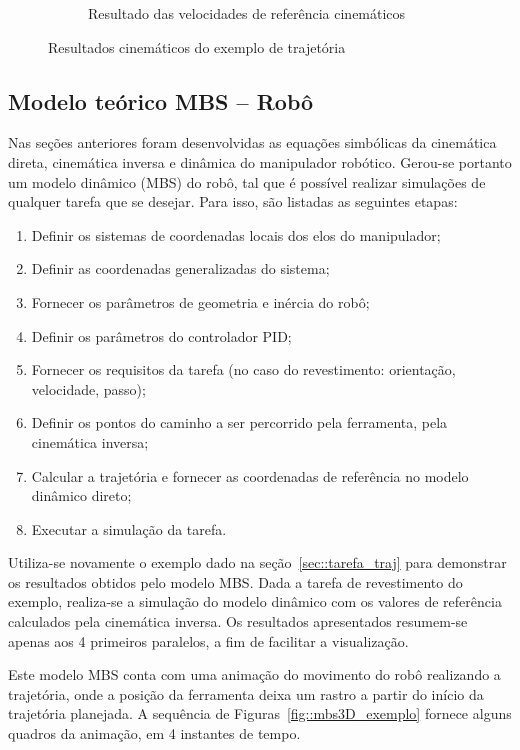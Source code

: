 \begin{figure}[h]
\begin{subfigure}[b]{0.45\textwidth}
        \caption{Resultado das velocidades de referência cinemáticos}
        \label{fig::uxt_exemplo}
    \end{subfigure}
    \caption{Resultados cinemáticos do exemplo de
    trajetória}\label{fig::res_exemplo}
\end{figure}


\subsection{Modelo teórico MBS -- Robô}

Nas seções anteriores foram desenvolvidas as equações simbólicas da
cinemática direta, cinemática inversa e dinâmica do manipulador robótico. 
Gerou-se portanto um modelo dinâmico (MBS) do robô, tal que é
possível realizar simulações de qualquer tarefa que se desejar. Para isso, são
listadas as seguintes etapas:

\begin{enumerate}
  \item Definir os sistemas de coordenadas locais dos elos do manipulador;
  \item Definir as coordenadas generalizadas do sistema;
  \item Fornecer os parâmetros de geometria e inércia do robô;
  \item Definir os parâmetros do controlador PID;
  \item Fornecer os requisitos da tarefa (no caso do revestimento: orientação,
  velocidade, passo);
  \item Definir os pontos do caminho a ser percorrido pela ferramenta, pela
  cinemática inversa;
  \item Calcular a trajetória e fornecer as coordenadas de referência no
  modelo dinâmico direto;
  \item Executar a simulação da tarefa. 
\end{enumerate}

Utiliza-se novamente o exemplo dado na seção~\ref{sec::tarefa_traj} para
demonstrar os resultados obtidos pelo modelo MBS. Dada a tarefa de revestimento
do exemplo, realiza-se a simulação do modelo dinâmico com os valores de
referência calculados pela cinemática inversa.  Os resultados apresentados
resumem-se apenas aos 4 primeiros paralelos, a fim de facilitar a visualização.

Este modelo MBS conta com uma animação do movimento do robô realizando a
trajetória, onde a posição da ferramenta deixa um rastro a partir do início da
trajetória planejada. A sequência de Figuras~\ref{fig::mbs3D_exemplo} fornece
alguns quadros da animação, em 4 instantes de tempo.

